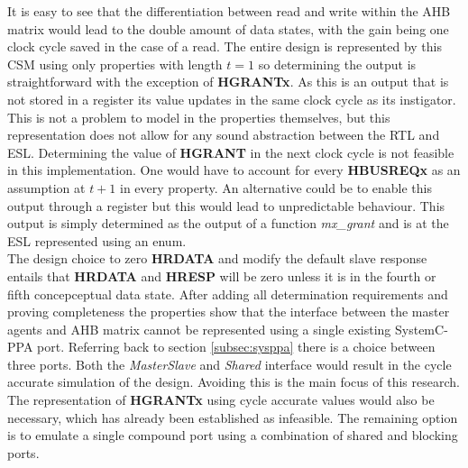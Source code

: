 It is easy to see that the differentiation between read and write within the AHB matrix would lead to the double amount of data states, with the gain being one clock cycle saved in the case of a read. The entire design is represented by this CSM using only properties with length $t=1$ so determining the output is straightforward with the exception of \textbf{HGRANTx}. As this is an output that is not stored in a register its value updates in the same clock cycle as its instigator. This is not a problem to model in the properties themselves, but this representation does not allow for any sound abstraction between the RTL and ESL. Determining the value of \textbf{HGRANT} in the next clock cycle is not feasible in this implementation. One would have to account for every \textbf{HBUSREQx} as an assumption at $t+1$ in every property. An alternative could be to enable this output through a register but this would lead to unpredictable behaviour. This output is simply determined as the output of a function \textit{mx\_grant} and is at the ESL represented using an enum. \\
\newline
The design choice to zero \textbf{HRDATA} and modify the default slave response entails that \textbf{HRDATA} and \textbf{HRESP} will be zero unless it is in the fourth or fifth concepceptual data state. After adding all determination requirements and proving completeness the properties show that the interface between the master agents and AHB matrix cannot be represented using a single existing SystemC-PPA port. Referring back to section \ref{subsec:sysppa} there is a choice between three ports. Both the \textit{MasterSlave} and \textit{Shared} interface would result in the cycle accurate simulation of the design. Avoiding this is the main focus of this research. The representation of \textbf{HGRANTx} using cycle accurate values would also be necessary, which has already been established as infeasible. The remaining option is to emulate a single compound port using a combination of shared and blocking ports.          


